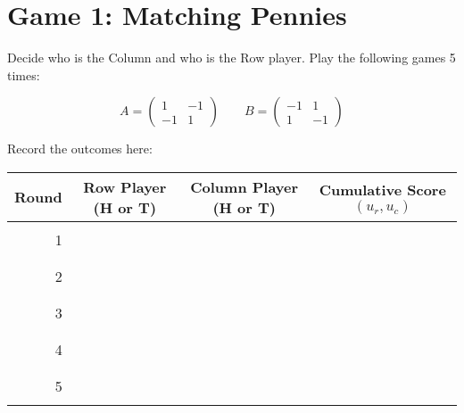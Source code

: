 \documentclass{article}
\begin{document}
\section{Game 1: Matching Pennies}

Decide who is the Column and who is the Row player. Play the following games 5 times:

$$
A=\begin{pmatrix}
    1  & -1\\
    -1 & 1
\end{pmatrix}
\qquad
B=\begin{pmatrix}
    -1 & 1\\
    1  & -1
\end{pmatrix}
$$

Record the outcomes here:

\begin{center}
\begin{tabular}{r|c|c|c}
\toprule
Round    & Row Player (H or T) & Column Player (H or T) & Cumulative Score $(u_r,u_c)$\\
\midrule
         &                     &                        & \\
1        &                     &                        & \\
         &                     &                        & \\
         &                     &                        & \\
2        &                     &                        & \\
         &                     &                        & \\
         &                     &                        & \\
3        &                     &                        & \\
         &                     &                        & \\
         &                     &                        & \\
4        &                     &                        & \\
         &                     &                        & \\
         &                     &                        & \\
5        &                     &                        & \\
         &                     &                        & \\
\bottomrule
\end{tabular}
\end{center}
\end{document}
